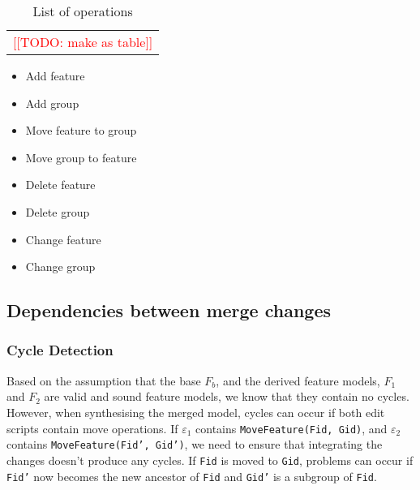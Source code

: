 \documentclass[a4paper,english]{ifimaster}
\newcommand{\todo}[1]{\textcolor{red}{[[TODO: #1]]}\PackageWarning{TODO:}{#1!}}
\newcommand{\Fb}{$F_b$}
\newcommand{\FOne}{$F_1$}
\newcommand{\FTwo}{$F_2$}
\newcommand{\EsOne}{$\varepsilon_1$}
\newcommand{\EsTwo}{$\varepsilon_2$}
\begin{document}
\begin{table}[htpb]
	\centering
	\caption{List of operations}
	\label{tab:list_of_operations}
	\begin{tabular}{c}
		\todo{make as table}
	\end{tabular}
	\begin{itemize}
		\item Add feature
		\item Add group
		\item Move feature to group
		\item Move group to feature
		\item Delete feature
		\item Delete group
		\item Change feature
		\item Change group
	\end{itemize}
\end{table}

\subsection{Dependencies between merge changes}%
\label{sub:dependencies_between_merge_changes}

\subsubsection{Cycle Detection}%
\label{ssub:cycle_detection}

Based on the assumption that the base \Fb{}, and the derived feature models, \FOne{} and \FTwo{} are valid and sound feature models, we know that they contain no cycles. However, when synthesising the merged model, cycles can occur if both edit scripts contain move operations. If \EsOne{} contains \texttt{MoveFeature(Fid, Gid)}, and \EsTwo{} contains \texttt{MoveFeature(Fid', Gid')}, we need to ensure that integrating the changes doesn't produce any cycles. If \texttt{Fid} is moved to \texttt{Gid}, problems can occur if \texttt{Fid'} now becomes the new ancestor of \texttt{Fid} and \texttt{Gid'} is a subgroup of \texttt{Fid}.

\backmatter{}

\printbibliography{}
\end{document}
